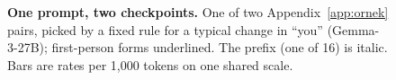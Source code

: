 \begin{figure}[b]
\caption{\textbf{One prompt, two checkpoints.} One of two Appendix~\ref{app:ornek} pairs, picked by a fixed rule for a typical change in ``you'' (Gemma-3-27B); first-person forms underlined. The prefix (one of 16) is italic. Bars are rates per 1,000 tokens on one shared scale.}
\label{fig:ornek}
\end{figure}

